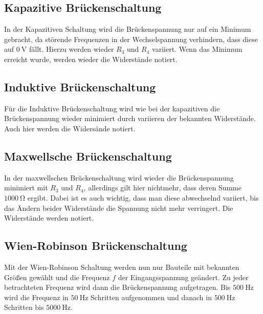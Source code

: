 \subsection{Kapazitive Brückenschaltung}
In der Kapazitiven Schaltung wird die Brückenspannung nur auf ein Minimum gebracht, da störende Frequenzen in der 
Wechselspannung verhindern, dass diese auf $\qty{0}{\volt}$ fällt. Hierzu werden wieder $R_3$ und $R_4$ variiert.
Wenn das Minimum erreicht wurde, werden wieder die Widerstände notiert.

\subsection{Induktive Brückenschaltung}
Für die Induktive Brückenschaltung wird wie bei der kapazitiven die Brückenspannung wieder minimiert durch variieren
der bekannten Widerstände. Auch hier werden die Widersände notiert.

\subsection{Maxwellsche Brückenschaltung}
In der maxwellschen Brückenschaltung wird wieder die Brückenspannung minimiert mit $R_3$ und $R_4$, allerdings gilt hier
nichtmehr, dass deren Summe $\qty{1000}{\ohm}$ ergibt. Dabei ist es auch wichtig, dass man diese abwechselnd variiert, bis
das Ändern beider Widerstände die Spannung nicht mehr verringert. Die Widerstände werden notiert.

\subsection{Wien-Robinson Brückenschaltung}
Mit der Wien-Robinson Schaltung werden nun nur Bauteile mit bekannten Größen gewählt und die Frequenz $f$ 
der Eingangsspannung geändert. Zu jeder betrachteten Frequenz wird dann die Brückenspannung aufgetragen. Bis 
$\qty{500}{\hertz}$ wird die Frequenz in $\qty{50}{\hertz}$ Schritten aufgenommen und danach in $\qty{500}{\hertz}$
Schritten bis $\qty{5000}{\hertz}$.



\label{sec:Durchführung}
